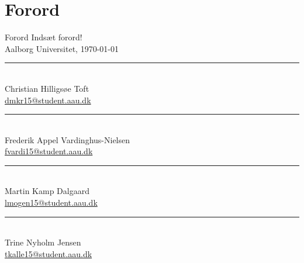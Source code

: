 \clearpage
\chapter*{Forord}
{Forord}
Indsæt forord!
\\
\vspace{\baselineskip}\hfill Aalborg Universitet, \today
\vfill\noindent
\begin{minipage}[b]{0.45\textwidth}
 \centering
 \rule{\textwidth}{0.5pt}\\
Christian Hilligsøe Toft\\
 {\footnotesize \href{mailto:cht15@student.aau.dk}{dmkr15@student.aau.dk}}  
\end{minipage}
\hfill
\begin{minipage}[b]{0.45\textwidth}
 \centering
 \rule{\textwidth}{0.5pt}\\
Frederik Appel Vardinghus-Nielsen\\
 {\footnotesize \href{mailto:fvardi15@student.aau.dk}{fvardi15@student.aau.dk}}
\end{minipage}
\vspace{3\baselineskip}
\vspace{1\baselineskip}
\begin{minipage}[b]{0.45\textwidth}
 \centering
 \rule{\textwidth}{0.5pt}\\
Martin Kamp Dalgaard\\
 {\footnotesize \href{mailto:mkda15@student.aau.dk}{lmogen15@student.aau.dk}}  
\end{minipage}
\hfill
\begin{minipage}[b]{0.45\textwidth}
 \centering
 \rule{\textwidth}{0.5pt}\\
 Trine Nyholm Jensen\\
 {\footnotesize \href{mailto:trijen15@student.aau.dk}{tkalle15@student.aau.dk}}  
\end{minipage}
\vspace{2\baselineskip}
\vspace{1\baselineskip}
